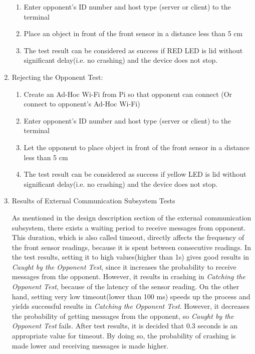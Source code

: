 \documentclass[a4paper,12pt]{article}
\begin{document}
\begin{enumerate}
\begin{enumerate}
		\item Enter opponent's ID number and host type (server or client) to the terminal
		
		\item Place an object in front of the front sensor in a distance less than 5 cm
		
		\item The test result can be considered as success if RED LED is lid without significant delay(i.e. no crashing) and the device does not stop.
		
	\end{enumerate}	
	
	\item Rejecting the Opponent Test:
	
	
	\begin{enumerate}
		
		\item Create an Ad-Hoc Wi-Fi from Pi so that opponent can connect (Or connect to opponent's Ad-Hoc Wi-Fi)
		
		\item Enter opponent's ID number and host type (server or client) to the terminal
		
		\item Let the opponent to place object  in front of the front sensor in a distance less than 5 cm
		
		\item The test result can be considered as success if yellow LED is lid without significant delay(i.e. no crashing) and the device does not stop.
		
	\end{enumerate}	
	
	
	
	\item{Results of External Communication Subsystem Tests}
	
	As mentioned in the design description section of the external communication subsystem, there exists a waiting period to receive messages from opponent. This duration, which is also called timeout, directly affects the frequency of the front sensor readings, because it is spent between consecutive readings. In the test results, setting it to high values(higher than 1s) gives good results in  \textit{Caught by the Opponent Test}, since it increases the probability to receive messages from the opponent. However, it results in crashing in \textit{Catching the Opponent Test}, because of the latency of the sensor reading. On the other hand, setting very low timeout(lower than 100 ms) speeds up the process and yields successful results in \textit{Catching the Opponent Test}. However, it decreases the probability of getting messages from the opponent, so \textit{Caught by the Opponent Test} fails. After test results, it is decided that 0.3 seconds is an appropriate value for timeout. By doing so, the probability of crashing is made lower and receiving messages is made higher.
	
\end{enumerate}
\end{document}
